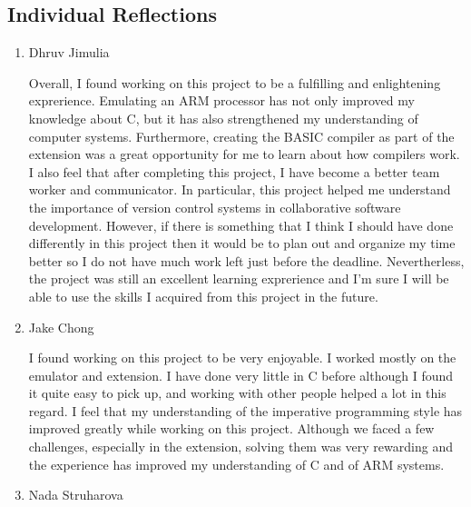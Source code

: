 \documentclass[11pt, letterpaper]{article}
\begin{document}
\subsection{Individual Reflections}

\begin{enumerate}

\item Dhruv Jimulia

Overall, I found working on this project to be a fulfilling and enlightening exprerience. Emulating an ARM processor has not only improved my knowledge about C, but it has also strengthened my understanding of computer systems. Furthermore, creating the BASIC compiler as part of the extension was a great opportunity for me to learn about how compilers work. I also feel that after completing this project, I have become a better team worker and communicator. In particular, this project helped me understand the importance of version control systems in collaborative software development. However, if there is something that I think I should have done differently in this project then it would be to plan out and organize my time better so I do not have much work left just before the deadline. Nevertherless, the project was still an excellent learning exprerience and I'm sure I will be able to use the skills I acquired from this project in the future.

\item Jake Chong

I found working on this project to be very enjoyable. I worked mostly on the emulator and extension. I have done very little in C before although I found it quite easy to pick up, and working with other people helped a lot in this regard. I feel that my understanding of the imperative programming style has improved greatly while working on this project. Although we faced a few challenges, especially in the extension, solving them was very rewarding and the experience has improved my understanding of C and of ARM systems.  

\item Nada Struharova


\end{enumerate}
\end{document}

